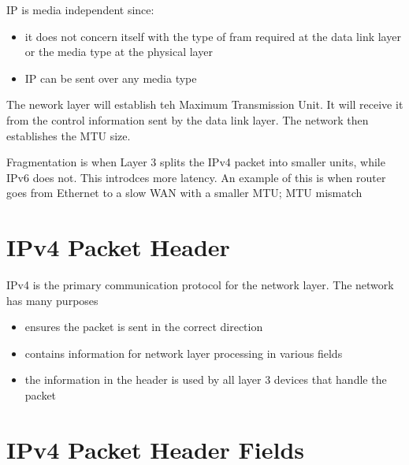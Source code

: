 \documentclass{article}
\begin{document}
IP is media independent since:

\begin{itemize}
    \item it does not concern itself with the type of fram required at the data link layer or the media
    type at the physical layer
    \item IP can be sent over any media type
\end{itemize}

\begin{flushleft}

    The nework layer will establish teh Maximum Transmission Unit. It will receive it from the control information
    sent by the data link layer. The network then establishes the MTU size. 

    Fragmentation is when Layer 3 splits the IPv4 packet into smaller units, while IPv6 does not. This introdces
    more latency. An example of this is when router goes from Ethernet to a slow WAN with a smaller MTU; MTU mismatch
\end{flushleft}


\section{\textbf{IPv4 Packet Header}}

\begin{flushleft}

    IPv4 is the primary communication protocol for the network layer. The network has many purposes
    \begin{itemize}
        \item ensures the packet is sent in the correct direction
        \item contains information for network layer processing in various fields
        \item the information in the header is used by all layer 3 devices that handle the packet
    \end{itemize}

\end{flushleft}

\section{\textbf{IPv4 Packet Header Fields}}
\end{document}
